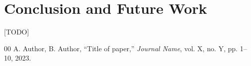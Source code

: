 \documentclass[conference]{IEEEtran}
\begin{document}
\section{Conclusion and Future Work}
[TODO]

\begin{thebibliography}{00}
 A. Author, B. Author, ``Title of paper,'' \textit{Journal Name}, vol. X, no. Y, pp. 1--10, 2023.
\end{thebibliography}
\end{document}
